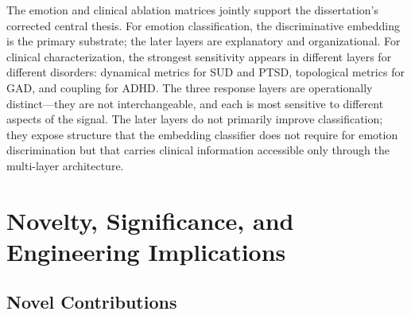 The emotion and clinical ablation matrices jointly support the dissertation's corrected central thesis. For emotion classification, the discriminative embedding is the primary substrate; the later layers are explanatory and organizational. For clinical characterization, the strongest sensitivity appears in different layers for different disorders: dynamical metrics for SUD and PTSD, topological metrics for GAD, and coupling for ADHD. The three response layers are operationally distinct---they are not interchangeable, and each is most sensitive to different aspects of the signal. The later layers do not primarily improve classification; they expose structure that the embedding classifier does not require for emotion discrimination but that carries clinical information accessible only through the multi-layer architecture.


\section{Novelty, Significance, and Engineering Implications}
\label{sec:ch5_novelty}

\subsection{Novel Contributions}

